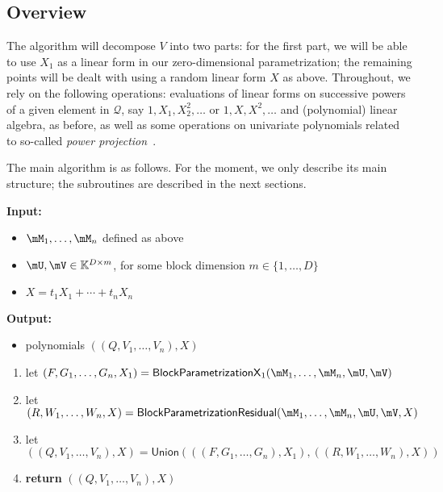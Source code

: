 \documentclass[12pt]{article}
\newcommand{\mainalgoname}{\mathsf{ BlockParametrization}}
\newcommand{\lf}{X}
\newcommand{\residueI}{\mathscr{Q}}
\newcommand{\sqfree}{Q}
\begin{document}
\subsection{Overview}

The algorithm will decompose $V$ into two parts: for the first part,
we will be able to use $X_1$ as a linear form in our zero-dimensional
parametrization; the remaining points will be dealt with using a
random linear form $\lf$ as above. Throughout, we rely on the
following operations: evaluations of linear forms on successive powers
of a given element in $\residueI$, say $1,X_1,X_2^2,\dots$ or
$1,\lf,\lf^2,\dots$ and (polynomial) linear algebra, as before, as well as
some operations on univariate polynomials related to so-called {\em
  power projection}~\cite{Shoup94,Shoup99}.

The main algorithm is as follows. For the moment, we only describe its
main structure; the subroutines are described in the next sections.

\begin{algorithm}[H]
  \caption{$\mathsf{ParametrizationWithSplitting}(\mM_1,\dots,\mM_n,\mU,\mV,\lf$)}
          {\bf Input:} \vspace{-0.5em}
	  \begin{itemize}
	  \item $\mM_1,\dots,\mM_n$ defined as above
	  \item  $\mU,\mV \in \mathbb{K}^{D \times m}$, for some block dimension  $m \in \{1,\dots,D\}$
          \item $\lf =t_1 X_1 + \cdots + t_n X_n$
	  \end{itemize}
	{\bf Output:}  \vspace{-0.5em}
	\begin{itemize}
		\item polynomials $((\sqfree,V_1,\dots,V_n),\lf)$
	\end{itemize}
	\begin{enumerate}
		\item let $(F,G_1,\dots,G_n,X_1)=\mathsf{BlockParametrizationX}_1(\mM_1,\dots,\mM_n,\mU,\mV)$
		\item let $(R,W_1,\dots,W_n,\lf)=\mainalgoname{\sf Residual}(\mM_1,\dots,\mM_n,\mU,\mV,\lf)$
		\item let $((\sqfree,V_1,\dots,V_n),\lf)=\mathsf{Union}(((F,G_1,\dots,G_n),X_1), ((R,W_1,\dots,W_n),\lf))$
		\item \textbf{return} $((\sqfree,V_1,\dots,V_n),\lf)$
	\end{enumerate}
\end{algorithm}
\end{document}
